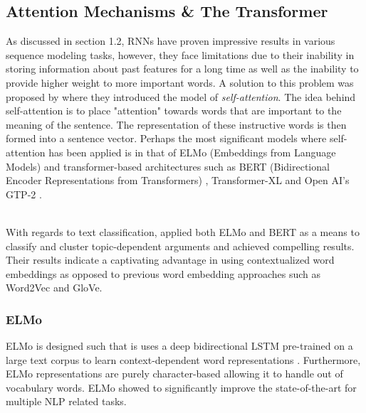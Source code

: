 \subsection{Attention Mechanisms \& The Transformer}

 As discussed in section 1.2, RNNs have proven impressive results in various sequence modeling tasks, however, they face limitations due to their inability in storing information about past features for a long time as well as the inability to provide higher weight to more important words. A solution to this problem was proposed by \citep{attention} where they introduced the model of \textit{self-attention}. The idea behind self-attention is to place "attention" towards words that are important to the meaning of the sentence. The representation of these instructive words is then formed into a sentence vector. Perhaps the most significant models where self-attention has been applied is in that of ELMo (Embeddings from Language Models) and transformer-based architectures such as BERT (Bidirectional Encoder Representations from Transformers) \citep{DBLP:journals/corr/abs-1810-04805}, Transformer-XL \citep{DBLP:journals/corr/abs-1901-02860} and Open AI's GTP-2 \citep{radford2019language}. 

 \noindent
\\ With regards to text classification, \citep{DBLP:journals/corr/abs-1906-09821} applied both ELMo and BERT as a means to classify and cluster
topic-dependent arguments and achieved compelling results. Their results indicate a captivating advantage in using contextualized word embeddings as opposed to previous word embedding approaches such as Word2Vec and GloVe.

 \subsubsection{ELMo}

 ELMo is designed such that is uses a deep bidirectional LSTM pre-trained on a large text corpus to learn context-dependent word representations \citep{Peters:2018}. Furthermore, ELMo representations are purely character-based allowing it to handle out of vocabulary words. ELMo showed to significantly improve the state-of-the-art for multiple NLP related tasks. 

